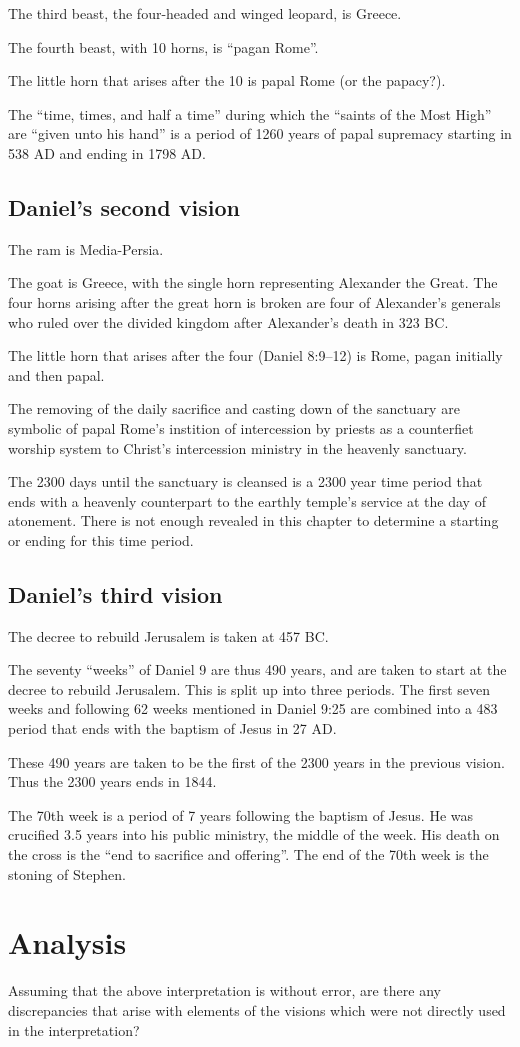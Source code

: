 \documentclass[]{article}
\begin{document}
The third beast, the four-headed and winged leopard, is Greece.

The fourth beast, with 10 horns, is ``pagan Rome''.

The little horn that arises after the 10 is papal Rome (or the papacy?).

The ``time, times, and half a time'' during which the ``saints of the Most High'' are ``given unto his hand'' is a period of 1260
years of papal supremacy starting in 538 AD and ending in 1798 AD.

\subsection{Daniel's second vision}
The ram is Media-Persia.

The goat is Greece, with the single horn representing Alexander the Great.  The four horns arising after the great horn is broken are
four of Alexander's generals who ruled over the divided kingdom after Alexander's death in 323 BC.

The little horn that arises after the four (Daniel 8:9--12) is Rome, pagan initially and then papal.

The removing of the daily sacrifice and casting down of the sanctuary are symbolic of papal Rome's instition of intercession by priests
as a counterfiet worship system to Christ's intercession ministry in the heavenly sanctuary.

The 2300 days until the sanctuary is cleansed is a 2300 year time period that ends with a heavenly counterpart to the earthly temple's
service at the day of atonement.  There is not enough revealed in this chapter to determine a starting or ending for this time period.

\subsection{Daniel's third vision}

The decree to rebuild Jerusalem is taken at 457 BC.

The seventy ``weeks'' of Daniel 9 are thus 490 years, and are taken to start at the decree to rebuild Jerusalem.  This is split up into three periods.
The first seven weeks and following 62 weeks mentioned in Daniel 9:25 are combined into a 483 period that ends with the baptism of Jesus in 27 AD.

These 490 years are taken to be the first of the 2300 years in the previous vision.  Thus the 2300 years ends in 1844.

The 70th week is a period of 7 years following the baptism of Jesus.  He was crucified 3.5 years into his public ministry, the middle of the week.
His death on the cross is the ``end to sacrifice and offering''.  The end of the 70th week is the stoning of Stephen.

\section{Analysis}
Assuming that the above interpretation is without error, are there any discrepancies that arise with elements of the visions which were not
directly used in the interpretation?
\end{document}
